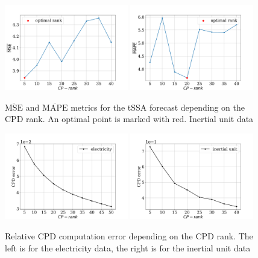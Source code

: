 \documentclass[referee, pdflatex, sn-mathphys-num]{sn-jnl}
\theoremstyle{definition}
\theoremstyle{plain}
\begin{document}
	\begin{figure}[h]
		\centering
		\includegraphics[width=0.48\textwidth, keepaspectratio]{pred_MSE_rank_motion.png}
		\includegraphics[width=0.48\textwidth, keepaspectratio]{pred_MAPE_rank_motion.png}
		\caption{$ \overline{\text{MSE}} $ and $ \overline{\text{MAPE}} $ metrics for the tSSA forecast depending on the CPD rank. An optimal point is marked with red. Inertial unit data}\label{fig:mse_mape_motion}
	\end{figure}
	
	\begin{figure}[h]
		\centering
		\includegraphics[width=0.48\textwidth, keepaspectratio]{CPD_error_elec.png}
		\includegraphics[width=0.48\textwidth, keepaspectratio]{CPD_error_motion.png}
		\caption{Relative CPD computation error depending on the CPD rank. The left is for the electricity data, the right is for the inertial unit data}\label{fig:cpd_errors}
	\end{figure}
	
\end{document}
